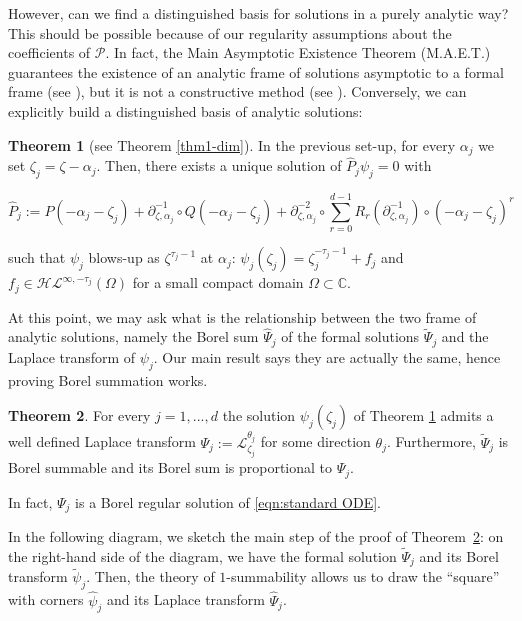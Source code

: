 \documentclass{article}
\theoremstyle{definition}
\newcommand{\C}{\mathbb{C}}
\newcommand{\series}[1]{\tilde{#1}}
\newcommand{\laplace}{\mathcal{L}}
\newtheorem{theorem}{Theorem}[section]
\begin{document}
However, can we find a distinguished basis for solutions in a purely analytic way? This should be possible because of our regularity assumptions about the coefficients of $\mathcal{P}$. In fact, the Main Asymptotic Existence Theorem (M.A.E.T.) guarantees the existence of an analytic frame of solutions asymptotic to a formal frame (see \cite[Theorem 3.1]{diverg-resurg-iii}), but it is not a constructive method (see \cite[Chapter 14]{balser}). Conversely, we can explicitly build a distinguished basis of analytic solutions: 

\begin{theorem}[see Theorem \ref{thm1-dim}]\label{thm1}
In the previous set-up, for every $\alpha_j$ we set $\zeta_j=\zeta-\alpha_j$. Then, there exists a unique solution of $\hat{P}_j\psi_j=0$ with 

\begin{equation}
\hat{P}_j:=P(-\alpha_j-\zeta_j)+\partial_{\zeta,\alpha_j}^{-1}\circ Q(-\alpha_j-\zeta_j)+\partial_{\zeta,\alpha_j}^{-2}\circ\sum_{r=0}^{d-1}R_r(\partial_{\zeta,\alpha_j}^{-1})\circ (-\alpha_j-\zeta_j)^r
\end{equation}

such that $\psi_j$ blows-up as $\zeta^{\tau_j-1}$ at $\alpha_j$:
${\psi}_j(\zeta_j)=\zeta_j^{-\tau_j-1}+f_j$ and $f_j\in\mathcal{HL}^{\infty,-\tau_j}(\Omega)$ for a small compact domain $\Omega\subset\C$. 
\end{theorem}


At this point, we may ask what is the relationship between the two frame of analytic solutions, namely the Borel sum $\hat{\Psi}_j$ of the formal solutions $\series{\Psi}_j$ and the Laplace transform of $\psi_j$. Our main result says they are actually the same, hence proving Borel summation works. 
 
\begin{theorem}\label{thm2}
For every $j=1,...,d$ the solution $\psi_j(\zeta_j)$ of Theorem \ref{thm1} admits a well defined Laplace transform $\Psi_j:=\laplace_{\zeta_j}^{\theta_j}$ for some direction $\theta_j$.
Furthermore, $\tilde{\Psi}_j$ is Borel summable and its Borel sum is proportional to $\Psi_j$. 
\end{theorem}

In fact, $\Psi_j$ is a Borel regular solution of \eqref{eqn:standard ODE}.  

In the following diagram, we sketch the main step of the proof of Theorem~\ref{thm2}: on the right-hand side of the diagram, we have the formal solution $\series{\Psi }_j$ and its Borel transform $\series{\psi}_j$. Then, the theory of $1$-summability allows us to draw the ``square'' with corners $\hat{\psi}_j$ and its Laplace transform $\hat{\Psi}_j$.  
\end{document}
